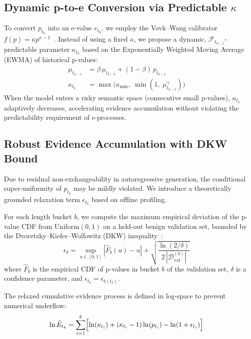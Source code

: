 \documentclass[letterpaper,twocolumn,10pt]{article}
\newcommand{\Fcal}{\mathcal{F}}
\newcommand{\Dcal}{\mathcal{D}}
\DeclareMathOperator*{\supop}{sup}
\begin{document}
\subsection{Dynamic p-to-e Conversion via Predictable $\kappa$}
\label{sec:kappa}

To convert $p_{t_k}$ into an e-value $e_{t_k}$, we employ the Vovk--Wang calibrator $f(p) = \kappa p^{\kappa - 1}$~\cite{vovk2021values}.
Instead of using a fixed $\kappa$, we propose a dynamic, $\Fcal_{t_{k-1}}$-predictable parameter $\kappa_{t_k}$ based on the Exponentially Weighted Moving Average (EWMA) of historical p-values:
\begin{align}
  \mu_{t_{k-1}} &= \beta\, \mu_{t_{k-2}} + (1 - \beta)\, p_{t_{k-1}} \label{eq:ewma} \\
  \kappa_{t_k}   &= \max\!\bigl(\kappa_{\min},\; \min(1,\; \mu_{t_{k-1}}^{\gamma})\bigr) \label{eq:kappa}
\end{align}
When the model enters a risky semantic space (consecutive small p-values), $\kappa_{t_k}$ adaptively decreases, accelerating evidence accumulation without violating the predictability requirement of e-processes.

\subsection{Robust Evidence Accumulation with DKW Bound}
\label{sec:dkw}

Due to residual non-exchangeability in autoregressive generation, the conditional super-uniformity of $p_{t_k}$ may be mildly violated.
We introduce a theoretically grounded relaxation term $\epsilon_{t_k}$ based on offline profiling.

For each length bucket $b$, we compute the maximum empirical deviation of the p-value CDF from Uniform$(0,1)$ on a held-out benign validation set, bounded by the Dvoretzky--Kiefer--Wolfowitz (DKW) inequality~\cite{massart1990tight}:
\begin{equation}
  \epsilon_b = \supop_{u \in [0,1]} \left|\hat{F}_b(u) - u\right| + \sqrt{\frac{\ln(2/\delta)}{2\,|\Dcal_{\mathrm{val}}^{(b)}|}}
  \label{eq:dkw}
\end{equation}
where $\hat{F}_b$ is the empirical CDF of p-values in bucket $b$ of the validation set, $\delta$ is a confidence parameter, and $\epsilon_{t_k} = \epsilon_{b(t_k)}$.

The relaxed cumulative evidence process is defined in log-space to prevent numerical underflow:
\begin{equation}
  \ln \tilde{E}_{t_k} = \sum_{i=1}^{k} \Bigl[\ln(\kappa_{t_i}) + (\kappa_{t_i} - 1)\ln(p_{t_i}) - \ln(1 + \epsilon_{t_i})\Bigr]
  \label{eq:eprocess}
\end{equation}
\end{document}
